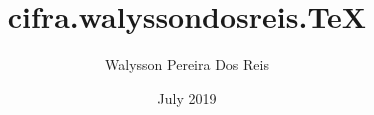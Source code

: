 \documentclass{article}
\title{cifra.walyssondosreis.TeX}
\author{Walysson Pereira Dos Reis}
\date{July 2019}
\begin{document}
\begin{songs}{}

\end{songs}
\end{document}
